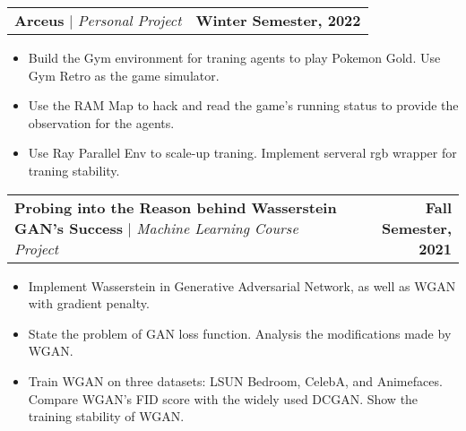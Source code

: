 \documentclass[letterpaper,11pt]{article}
\makeatletter
\newcommand{\resumeItem}[1]{
  \item\small{
    {\raggedright #1 \vspace{-2pt}}
  }
}
\newcommand{\resumeProjectHeading}[2]{
    \item
    \begin{tabular*}{1.001\textwidth}{l@{\extracolsep{\fill}}r}
      \small#1 & \textbf{\small #2}\\
    \end{tabular*}\vspace{-7pt}
}
\newcommand{\resumeItemListStart}{\begin{itemize}}
\newcommand{\resumeItemListEnd}{\end{itemize}\vspace{-3pt}}
\makeatother
\begin{document}
      \resumeProjectHeading
        {\textbf{Arceus} $|$ \emph{Personal Project}}{Winter Semester, 2022}
        \resumeItemListStart
          \resumeItem{Build the Gym environment for traning agents to play Pokemon Gold. Use Gym Retro as the game simulator.}
          \resumeItem{Use the RAM Map to hack and read the game's running status to provide the observation for the agents.}
          \resumeItem{Use Ray Parallel Env to scale-up traning. Implement serveral rgb wrapper for traning stability.}
        \resumeItemListEnd
        \vspace{-13pt}
      \resumeProjectHeading
        {\textbf{Probing into the Reason behind Wasserstein GAN’s Success} $|$ \emph{Machine Learning Course Project}}{Fall Semester, 2021}
        \resumeItemListStart
          \resumeItem{Implement Wasserstein in Generative Adversarial Network, as well as WGAN with gradient penalty.}
          \resumeItem{State the problem of GAN loss function. Analysis the modifications made by WGAN.}
          \resumeItem{Train WGAN on three datasets: LSUN Bedroom, CelebA, and Animefaces. Compare WGAN's FID score with the widely used DCGAN. Show the training stability of WGAN.}
        \resumeItemListEnd
      
\end{document}
